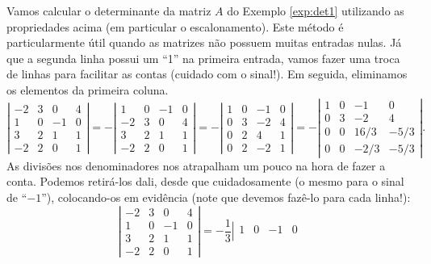 \begin{ex}
Vamos calcular o determinante da matriz $A$ do Exemplo \ref{exp:det1} utilizando as propriedades acima (em particular o escalonamento). Este método é particularmente útil quando as matrizes não possuem muitas entradas nulas. Já que a segunda linha possui um ``1'' na primeira entrada, vamos fazer uma troca de linhas para facilitar as contas (cuidado com o sinal!). Em seguida, eliminamos os elementos da primeira coluna.
\begin{equation}
\left| \begin{matrix}
-2 & 3 & 0  & 4 \\
1  & 0 & -1 & 0 \\
3  & 2 & 1  & 1 \\
-2 & 2 & 0  & 1
\end{matrix}
\right| = -
\left| \begin{matrix}
1  & 0 & -1 & 0 \\
-2 & 3 & 0  & 4 \\
3  & 2 & 1  & 1 \\
-2 & 2 & 0  & 1
\end{matrix}
\right| = -
\left| \begin{matrix}
1  & 0 & -1 & 0 \\
0  & 3 & -2 & 4 \\
0  & 2 & 4  & 1 \\
0  & 2 & -2 & 1
\end{matrix}
\right| = -
\left| \begin{matrix}
1  & 0 & -1   & 0 \\
0  & 3 & -2   & 4 \\
0  & 0 & 16/3 & -5/3 \\
0  & 0 & -2/3 & -5/3
\end{matrix}
\right|.
\end{equation} As divisões nos denominadores nos atrapalham um pouco na hora de fazer a conta. Podemos retirá-los dali, desde que cuidadosamente (o mesmo para o sinal de ``$-1$''), colocando-os em evidência (note que devemos fazê-lo para cada linha!):
\begin{equation}
\left| \begin{matrix}
-2 & 3 & 0  & 4 \\
1  & 0 & -1 & 0 \\
3  & 2 & 1  & 1 \\
-2 & 2 & 0  & 1
\end{matrix}
\right| = -\frac{1}{3}
\left| \begin{matrix}
1  & 0 & -1   & 0 \\

\end{matrix}
\end{equation}
\end{ex}
